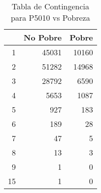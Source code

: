 \begin{table}[ht]
\centering
\begin{tabular}{rrr}
  \toprule
 & No Pobre & Pobre \\ 
  \midrule
1 & 45031 & 10160 \\ 
  2 & 51282 & 14968 \\ 
  3 & 28792 & 6590 \\ 
  4 & 5653 & 1087 \\ 
  5 & 927 & 183 \\ 
  6 & 189 &  28 \\ 
  7 &  47 &   5 \\ 
  8 &  13 &   3 \\ 
  9 &   1 &   0 \\ 
  15 &   1 &   0 \\ 
   \bottomrule
\end{tabular}
\caption{Tabla de Contingencia para P5010 vs Pobreza} 
\label{tab:contingency_P5010}
\end{table}
